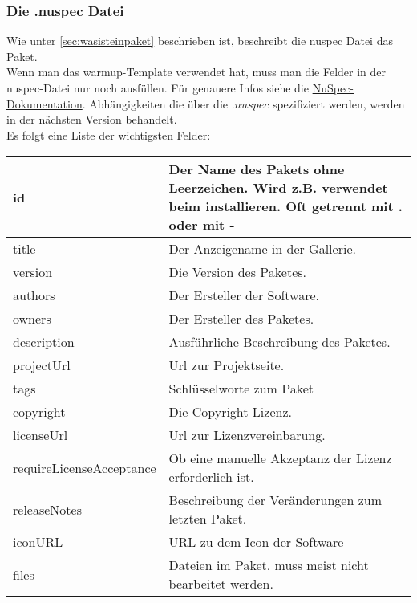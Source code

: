 \documentclass[10pt,a4paper]{article}
\begin{document}
\subsubsection{Die .nuspec Datei}
Wie unter \ref{sec:wasisteinpaket} beschrieben ist, beschreibt die nuspec Datei das Paket.\\
Wenn man das warmup-Template verwendet hat, muss man die Felder in der nuspec-Datei nur noch ausfüllen. Für genauere Infos siehe die \href{http://docs.nuget.org/docs/reference/nuspec-reference}{NuSpec-Dokumentation}. Abhängigkeiten die über die $.nuspec$ spezifiziert werden, werden in der nächsten Version behandelt.
\\
Es folgt eine Liste der wichtigsten Felder:\\
\begin{tabularx}{\columnwidth}{l|X}
id                       & Der Name des Pakets ohne Leerzeichen. Wird z.B. verwendet beim installieren. Oft  getrennt mit . oder mit - \\
\hline
title                    & Der Anzeigename in der Gallerie.                                                                            \\\hline
version                  & Die Version des Paketes.                                                                                    \\\hline
authors                  & Der Ersteller der Software.                                                                                 \\\hline
owners                   & Der Ersteller des Paketes.                                                                                  \\\hline
description              & Ausführliche Beschreibung des Paketes.                                                                      \\\hline
projectUrl               & Url zur Projektseite.                                                                                       \\\hline
tags                     & Schlüsselworte zum Paket                                                                                    \\\hline
copyright                & Die Copyright Lizenz.                                                                                       \\\hline
licenseUrl               & Url zur Lizenzvereinbarung.                                                                                 \\\hline
requireLicenseAcceptance & Ob eine manuelle Akzeptanz der Lizenz erforderlich ist.                                                     \\\hline
releaseNotes             & Beschreibung der Veränderungen zum letzten Paket.                                                          
 \\\hline
 iconURL 				& URL zu dem Icon der Software
\\\hline
files                    & Dateien im Paket, muss meist nicht bearbeitet werden.
\end{tabularx}
\end{document}
